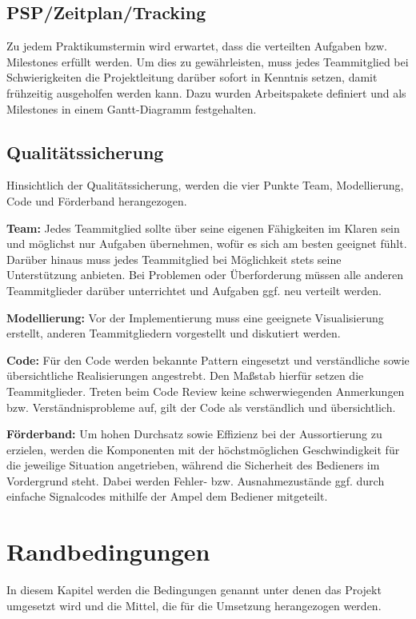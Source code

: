 \documentclass[a4paper, 11pt]{article}
\begin{document}
\subsection{PSP/Zeitplan/Tracking}
Zu jedem Praktikumstermin wird erwartet, dass die verteilten Aufgaben bzw. Milestones erfüllt werden. Um dies zu gewährleisten, muss jedes Teammitglied bei Schwierigkeiten die Projektleitung darüber sofort in Kenntnis setzen, damit frühzeitig ausgeholfen werden kann. Dazu wurden Arbeitspakete definiert und als Milestones in einem Gantt-Diagramm festgehalten.

\subsection{Qualitätssicherung}
Hinsichtlich der Qualitätssicherung, werden die vier Punkte Team, Modellierung, Code und Förderband herangezogen.
\medskip
\begin{compactenum}[1.]
    \item \textbf{Team:} Jedes Teammitglied sollte über seine eigenen Fähigkeiten im Klaren sein und möglichst nur Aufgaben übernehmen, wofür es sich am besten geeignet fühlt. Darüber hinaus muss jedes Teammitglied bei Möglichkeit stets seine Unterstützung anbieten. Bei Problemen oder Überforderung müssen alle anderen Teammitglieder darüber unterrichtet und Aufgaben ggf. neu verteilt werden.
\medskip
    \item \textbf{Modellierung:} Vor der Implementierung muss eine geeignete Visualisierung erstellt, anderen Teammitgliedern vorgestellt und diskutiert werden. 
\medskip
    \item \textbf{Code:} Für den Code werden bekannte Pattern eingesetzt und verständliche sowie übersichtliche Realisierungen angestrebt. Den Maßstab hierfür setzen die Teammitglieder. Treten beim Code Review keine schwerwiegenden Anmerkungen bzw. Verständnisprobleme auf, gilt der Code als verständlich und übersichtlich.
\medskip
    \item \textbf{Förderband:} Um hohen Durchsatz sowie Effizienz bei der Aussortierung zu erzielen, werden die Komponenten mit der höchstmöglichen Geschwindigkeit für die jeweilige Situation angetrieben, während die Sicherheit des Bedieners im Vordergrund steht. Dabei werden Fehler- bzw. Ausnahmezustände ggf. durch einfache Signalcodes mithilfe der Ampel dem Bediener mitgeteilt.
\end{compactenum}

\section{Randbedingungen}
In diesem Kapitel werden die Bedingungen genannt unter denen das Projekt umgesetzt wird und die Mittel, die für die Umsetzung herangezogen werden.
\end{document}
